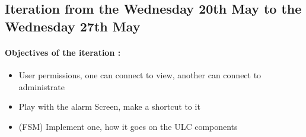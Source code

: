 \documentclass[a4paper, 10pt]{article}
\begin{document}
\subsection{Iteration from the Wednesday 20th May to the Wednesday 27th May}
\paragraph{Objectives of the iteration :}
\begin{itemize}
    \item User permissions, one can connect to view, another can connect to administrate
    \item Play with the alarm Screen, make a shortcut to it
    \item (FSM) Implement one, how it goes on the ULC components
\end{itemize}
\end{document}
